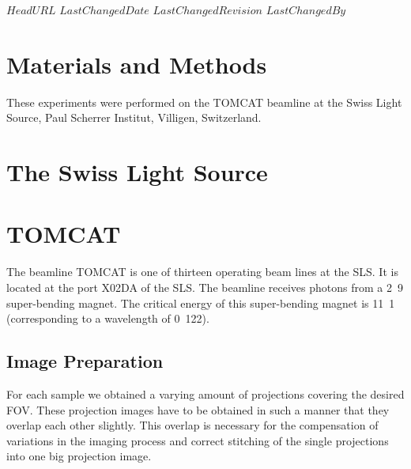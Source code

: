\svnidlong
{$HeadURL$}
{$LastChangedDate$}
{$LastChangedRevision$}
{$LastChangedBy$}
\section{Materials and Methods}

These experiments were performed on the TOMCAT beamline at the Swiss Light Source, Paul Scherrer Institut, Villigen, Switzerland.

\section{The Swiss Light Source}

\section{TOMCAT}
\label{sec:tomcat}
The beamline TOMCAT is one of thirteen operating beam lines at the SLS. It is located at the port X02DA of the SLS. The beamline receives photons from a \unit{2.9}{\tesla} super-bending magnet. The critical energy of this super-bending magnet is \unit{11.1}{\kilo\electronvolt} (corresponding to a wavelength of \unit{0.122}{\nano\meter}).


\subsection{Image Preparation}
For each sample we obtained a varying amount of projections covering the desired FOV. These projection images have to be obtained in such a manner that they overlap each other slightly. This overlap is necessary for the compensation of variations in the imaging process and correct stitching of the single projections into one big projection image. 

